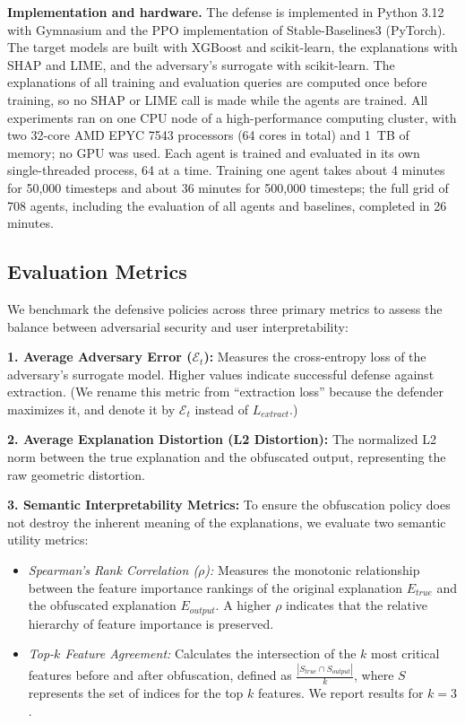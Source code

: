 \documentclass[conference]{IEEEtran}
\DeclareRobustCommand{\rev}[1]{#1}
\DeclareRobustCommand{\revnew}[1]{#1}
\begin{document}
\revnew{\textbf{Implementation and hardware.} The defense is implemented in Python 3.12 with Gymnasium and the PPO implementation of Stable-Baselines3 (PyTorch). The target models are built with XGBoost and scikit-learn, the explanations with SHAP and LIME, and the adversary's surrogate with scikit-learn. The explanations of all training and evaluation queries are computed once before training, so no SHAP or LIME call is made while the agents are trained. All experiments ran on one CPU node of a high-performance computing cluster, with two 32-core AMD EPYC 7543 processors (64 cores in total) and 1~TB of memory; no GPU was used. Each agent is trained and evaluated in its own single-threaded process, 64 at a time. Training one agent takes about 4 minutes for 50,000 timesteps and about 36 minutes for 500,000 timesteps; the full grid of 708 agents, including the evaluation of all agents and baselines, completed in 26 minutes.}

\subsection{Evaluation Metrics}
\label{sec:metrics}
We benchmark the defensive policies across three primary metrics to assess the balance between adversarial security and user interpretability:

\textbf{1. Average \rev{Adversary Error} ($\revnew{\mathcal{E}_t}$):} Measures the cross-entropy loss of the adversary's surrogate model. Higher values indicate successful defense against extraction. \rev{(We rename this metric from ``extraction loss'' because the defender maximizes it\revnew{, and denote it by $\mathcal{E}_t$ instead of $L_{extract}$}.)}

\textbf{2. Average \rev{Explanation Distortion} (L2 Distortion):} The normalized L2 norm between the true explanation and the obfuscated output, representing the raw geometric distortion.

\textbf{3. Semantic Interpretability Metrics:} To ensure the obfuscation policy does not destroy the inherent meaning of the explanations, we evaluate two semantic utility metrics:
\begin{itemize}
    \item \textit{Spearman's Rank Correlation ($\rho$):} Measures the monotonic relationship between the feature importance rankings of the original explanation $E_{true}$ and the obfuscated explanation $E_{output}$. A higher $\rho$ indicates that the relative hierarchy of feature importance is preserved.
    \item \textit{Top-$k$ Feature Agreement:} Calculates the intersection of the $k$ most critical features before and after obfuscation, defined as $\frac{|S_{true} \cap S_{output}|}{k}$, where $S$ represents the set of indices for the top $k$ features. We report results for $k=3$.
\end{itemize}
\end{document}
